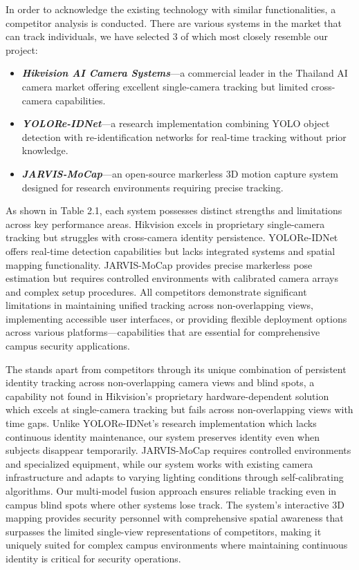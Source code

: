 In order to acknowledge the existing technology with similar functionalities, a competitor analysis is conducted.
There are various systems in the market that can track individuals, we have selected 3 of which most closely resemble our project:

\begin{itemize}
   \item \textbf{\textit{Hikvision AI Camera Systems}}---a commercial leader in the Thailand AI camera market offering excellent single-camera tracking but limited cross-camera capabilities.
   \item \textbf{\textit{YOLORe-IDNet}}---a research implementation combining YOLO object detection with re-identification networks for real-time tracking without prior knowledge.
   \item \textbf{\textit{JARVIS-MoCap}}---an open-source markerless 3D motion capture system designed for research environments requiring precise tracking.
\end{itemize}
\par

As shown in Table 2.1, each system possesses distinct strengths and limitations across key performance areas. Hikvision excels in proprietary single-camera tracking but struggles with cross-camera identity persistence. YOLORe-IDNet offers real-time detection capabilities but lacks integrated systems and spatial mapping functionality. JARVIS-MoCap provides precise markerless pose estimation but requires controlled environments with calibrated camera arrays and complex setup procedures. All competitors demonstrate significant limitations in maintaining unified tracking across non-overlapping views, implementing accessible user interfaces, or providing flexible deployment options across various platforms—capabilities that are essential for comprehensive campus security applications.

The \usevar{\srsTitle} stands apart from competitors through its unique combination of persistent identity tracking across non-overlapping camera views and blind spots, a capability not found in Hikvision's proprietary hardware-dependent solution which excels at single-camera tracking but fails across non-overlapping views with time gaps. Unlike YOLORe-IDNet's research implementation which lacks continuous identity maintenance, our system preserves identity even when subjects disappear temporarily. JARVIS-MoCap requires controlled environments and specialized equipment, while our system works with existing camera infrastructure and adapts to varying lighting conditions through self-calibrating algorithms. Our multi-model fusion approach ensures reliable tracking even in campus blind spots where other systems lose track. The system's interactive 3D mapping provides security personnel with comprehensive spatial awareness that surpasses the limited single-view representations of competitors, making it uniquely suited for complex campus environments where maintaining continuous identity is critical for security operations.

